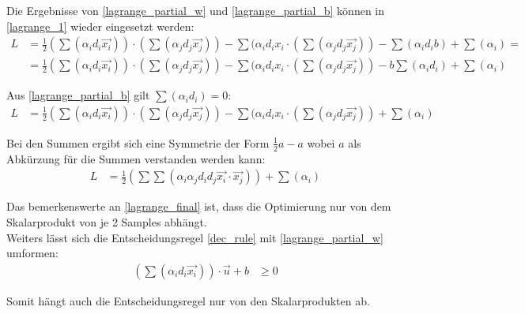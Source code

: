 \documentclass[a4paper,11pt,twoside]{scrreprt}
\begin{document}
Die Ergebnisse von \autoref{lagrange_partial_w} und \autoref{lagrange_partial_b} können in \autoref{lagrange_1} wieder eingesetzt werden:
\begin{equation} \label{lagrange_2}
    \begin{aligned}
    L &= \frac{1}{2} (\sum (\alpha_{i} d_{i} \vec{x_{i}})) \cdot (\sum (\alpha_{j} d_{j} \vec{x_{j}})) - \sum (\alpha_{i} d_{i} x_{i} \cdot (\sum (\alpha_{j} d_{j} \vec{x_{j}})) - \sum (\alpha_{i} d_{i} b) + \sum (\alpha_{i}) =\\
    &= \frac{1}{2} (\sum (\alpha_{i} d_{i} \vec{x_{i}})) \cdot (\sum (\alpha_{j} d_{j} \vec{x_{j}})) - \sum (\alpha_{i} d_{i} x_{i} \cdot (\sum (\alpha_{j} d_{j} \vec{x_{j}})) - b \sum (\alpha_{i} d_{i}) + \sum (\alpha_{i})
    \end{aligned}
\end{equation}

Aus \autoref{lagrange_partial_b} gilt $\sum (\alpha_{i} d_{i}) = 0$:
\begin{equation} \label{lagrange_3}
    \begin{aligned}
    L &= \frac{1}{2} (\sum (\alpha_{i} d_{i} \vec{x_{i}})) \cdot (\sum (\alpha_{j} d_{j} \vec{x_{j}})) - \sum (\alpha_{i} d_{i} x_{i} \cdot (\sum (\alpha_{j} d_{j} \vec{x_{j}})) + \sum (\alpha_{i})
    \end{aligned}
\end{equation}

Bei den Summen ergibt sich eine Symmetrie der Form $\frac{1}{2} a - a$ wobei $a$ als Abkürzung für die Summen verstanden werden kann:
\begin{equation} \label{lagrange_final}
    \begin{aligned}
    L &= \frac{1}{2} (\sum \sum (\alpha_{i} \alpha_{j} d_{i} d_{j} \vec{x_{i}} \cdot \vec{x_{j}})) + \sum (\alpha_{i})
    \end{aligned}
\end{equation}

Das bemerkenswerte an \autoref{lagrange_final} ist, dass die Optimierung nur von dem Skalarprodukt von je 2 Samples abhängt. \\

Weiters lässt sich die Entscheidungsregel \autoref{dec_rule} mit \autoref{lagrange_partial_w} umformen:
\begin{equation} \label{dec_rule}
    \begin{aligned}
    (\sum (\alpha_{i} d_{i} \vec{x_{i}})) \cdot \vec{u} + b & \geq 0 
    \end{aligned}
\end{equation}

Somit hängt auch die Entscheidungsregel nur von den Skalarprodukten ab.



\clearpage
{}
{}
\printbibliography
\end{document}
